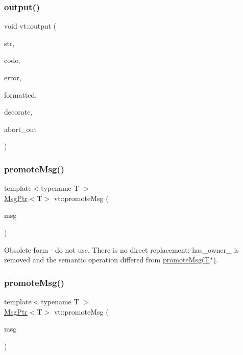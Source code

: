 \subsubsection{\texorpdfstring{output()}{output()}}
{\footnotesize\ttfamily void vt\+::output (\begin{DoxyParamCaption}\item[{std\+::string const}]{str,  }\item[{int32\+\_\+t const}]{code,  }\item[{bool}]{error,  }\item[{bool}]{formatted,  }\item[{bool}]{decorate,  }\item[{bool}]{abort\+\_\+out }\end{DoxyParamCaption})}

\mbox{\label{namespacevt_af00ebdeb74801e5658cf5726193d5753}} 
\subsubsection{\texorpdfstring{promote\+Msg()}{promoteMsg()}\hspace{0.1cm}{\footnotesize\ttfamily [1/2]}}
{\footnotesize\ttfamily template$<$typename T $>$ \\
\hyperlink{namespacevt_a9f5ebd62ee9d6dd8829e3e1cc4f858e9}{Msg\+Ptr}$<$T$>$ vt\+::promote\+Msg (\begin{DoxyParamCaption}\item[{\hyperlink{namespacevt_a9f5ebd62ee9d6dd8829e3e1cc4f858e9}{Msg\+Ptr}$<$ T $>$}]{msg }\end{DoxyParamCaption})\hspace{0.3cm}{\ttfamily [inline]}}

Obsolete form -\/ do not use. There is no direct replacement; has\+\_\+owner\+\_\+ is removed and the semantic operation differed from \hyperlink{namespacevt_a991383de8a150393ef67012fbe689dd0}{promote\+Msg(\+T$\ast$)}. \mbox{\label{namespacevt_a991383de8a150393ef67012fbe689dd0}} 
\subsubsection{\texorpdfstring{promote\+Msg()}{promoteMsg()}\hspace{0.1cm}{\footnotesize\ttfamily [2/2]}}
{\footnotesize\ttfamily template$<$typename T $>$ \\
\hyperlink{namespacevt_a9f5ebd62ee9d6dd8829e3e1cc4f858e9}{Msg\+Ptr}$<$T$>$ vt\+::promote\+Msg (\begin{DoxyParamCaption}\item[{T $\ast$}]{msg }\end{DoxyParamCaption})\hspace{0.3cm}{\ttfamily [inline]}}



